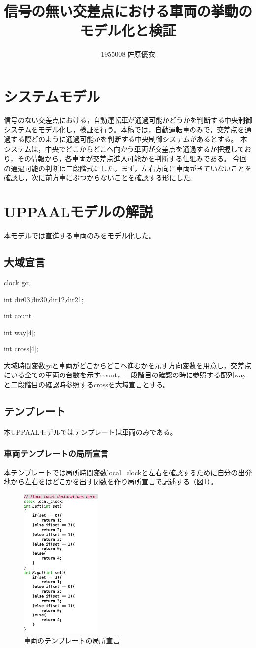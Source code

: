 \documentclass[twocolumn,a4paper]{jsarticle}
\title{信号の無い交差点における車両の挙動のモデル化と検証}
\author{1955008	佐原優衣}
\date{}
\begin{document}
\maketitle

\section{システムモデル}
信号のない交差点における，自動運転車が通過可能かどうかを判断する中央制御システムをモデル化し，検証を行う。本稿では，自動運転車のみで，交差点を通過する際どのように通過可能かを判断する中央制御システムがあるとする。
本システムは，中央でどこからどこへ向かう車両が交差点を通過するか把握しており，その情報から，各車両が交差点進入可能かを判断する仕組みである。
今回の通過可能の判断は二段階式にした。まず，左右方向に車両がきていないことを確認し，次に前方車にぶつからないことを確認する形にした。
\section{UPPAALモデルの解説}
本モデルでは直進する車両のみをモデル化した。
\subsection{大域宣言}

clock		gc;

int dir03,dir30,dir12,dir21;

int count;

int way[4];

int cross[4];

大域時間変数gcと車両がどこからどこへ進むかを示す方向変数を用意し，交差点にいる全ての車両の台数を示すcount，一段階目の確認の時に参照する配列wayと二段階目の確認時参照するcrossを大域宣言とする。

\subsection{テンプレート}
本UPPAALモデルではテンプレートは車両のみである。
\subsubsection{車両テンプレートの局所宣言}
本テンプレートでは局所時間変数local\_clockと左右を確認するために自分の出発地から左右をはどこかを出す関数を作り局所宣言で記述する（図\ref{locdec}）。
\begin{figure}
  \centering
  \includegraphics[width=40mm]{local_dec.png}
  \caption{車両のテンプレートの局所宣言}
  \label{locdec}
\end{figure}
\end{document}
